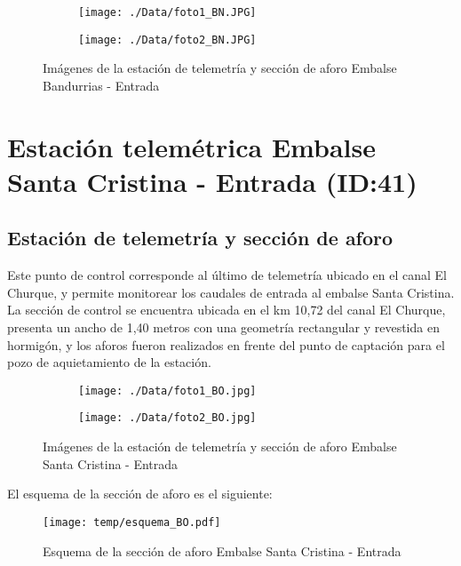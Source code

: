 \documentclass[]{article}
\begin{document}
\begin{figure}[H]
  \centering
\begin{subfigure}{.49\textwidth}
  \texttt{[image: ./Data/foto1\_BN.JPG]}
\end{subfigure}
\hfill
\begin{subfigure}{.49\textwidth}
  \texttt{[image: ./Data/foto2\_BN.JPG]}
\end{subfigure}
\caption{Imágenes de la estación de telemetría y sección de aforo Embalse Bandurrias - Entrada}
\label{fig:fotos_40}
\end{figure}



\clearpage
\section{Estación telemétrica Embalse Santa Cristina - Entrada (ID:41)}

\subsection{Estación de telemetría y sección de aforo}

Este punto de control corresponde al último de telemetría ubicado en el canal El Churque, y permite monitorear los caudales de entrada al embalse Santa Cristina. La sección de control se encuentra ubicada en el km 10,72 del canal El Churque, presenta un ancho de 1,40 metros con una geometría rectangular y revestida en hormigón, y los aforos fueron realizados en frente del punto de captación para el pozo de aquietamiento de la estación.


\begin{figure}[H]
  \centering
\begin{subfigure}{.49\textwidth}
  \texttt{[image: ./Data/foto1\_BO.jpg]}
\end{subfigure}
\hfill
\begin{subfigure}{.49\textwidth}
  \texttt{[image: ./Data/foto2\_BO.jpg]}
\end{subfigure}
\caption{Imágenes de la estación de telemetría y sección de aforo Embalse Santa Cristina - Entrada}
\label{fig:fotos_41}
\end{figure}

El esquema de la sección de aforo es el siguiente:

\begin{figure}[H]
  \centering
  \texttt{[image: temp/esquema\_BO.pdf]}
\caption{Esquema de la sección de aforo Embalse Santa Cristina - Entrada}
\label{fig:Esquema_BO}
\end{figure}
\end{document}

